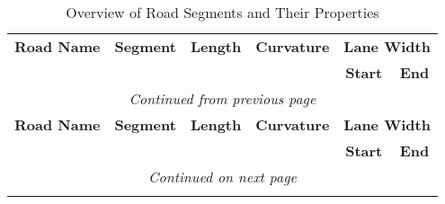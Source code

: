 \begin{longtable}{l c c c c c}
	\caption{Overview of Road Segments and Their Properties}                                                                                             \\
	\toprule
	\textbf{Road Name}                & \textbf{Segment} & \textbf{Length} & \textbf{Curvature} & \multicolumn{2}{c}{\textbf{Lane Width}}                \\
	\cmidrule(lr){5-6}
	                                  &                  &                 &                    & \textbf{Start}                          & \textbf{End} \\
	\midrule
	\endfirsthead

	\multicolumn{6}{c}{\textit{Continued from previous page}}                                                                                            \\
	\toprule
	\textbf{Road Name}                & \textbf{Segment} & \textbf{Length} & \textbf{Curvature} & \multicolumn{2}{c}{\textbf{Lane Width}}                \\
	\cmidrule(lr){5-6}
	                                  &                  &                 &                    & \textbf{Start}                          & \textbf{End} \\
	\midrule
	\endhead

	\bottomrule
	\multicolumn{6}{c}{\textit{Continued on next page}}                                                                                                  \\
	\endfoot

	\bottomrule
	\endlastfoot


\end{longtable}

